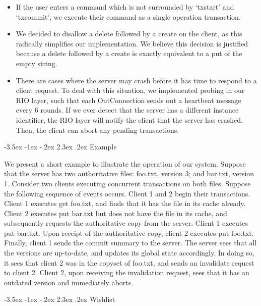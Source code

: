 \documentclass[12pt]{article}
\makeatletter
\renewcommand\section{\@startsection{section}{1}{\z@}%
								 {-3.5ex \@plus -1ex \@minus -.2ex}%
								 {2.3ex \@plus.2ex}%
								 {\normalfont\large\bfseries}}
\makeatother
\begin{document}
\begin{itemize}
\item If the user enters a command which is not surrounded by `txstart' and `txcommit', we execute their command as a single operation transaction.
\item We decided to disallow a delete followed by a create on the client, as this radically simplifies our implementation. We believe this decision is justified because a delete followed by a create is exactly equivalent to a put of the empty string.
\item There are cases where the server may crash before it has time to respond to a client request. To deal with this situation, we implemented probing in our RIO layer, such that each OutConnection sends out a heartbeat message every 6 rounds. If we ever detect that the server has a different instance identifier, the RIO layer will notify the client that the server has crashed. Then, the client can abort any pending transactions.
\end{itemize}

\section{Example}

We present a short example to illustrate the operation of our system. Suppose that the server has two authoritative files: foo.txt, version 3; and bar.txt, version 1. Consider two clients executing concurrent transactions on both files. Suppose the following sequence of events occurs. Client 1 and 2 begin their transactions. Client 1 executes get foo.txt, and finds that it has the file in its cache already. Client 2 executes put bar.txt but does not have the file in its cache, and subsequently requests the authoritative copy from the server. Client 1 executes put bar.txt. Upon receipt of the authoritative copy, client 2 executes put foo.txt. Finally, client 1 sends the commit summary to the server. The server sees that all the versions are up-to-date, and updates its global state accordingly. In doing so, it sees that client 2 was in the copyset of foo.txt, and sends an invalidate request to client 2. Client 2, upon receiving the invalidation request, sees that it has an outdated version and immediately aborts.

\section{Wishlist}
\end{document}
